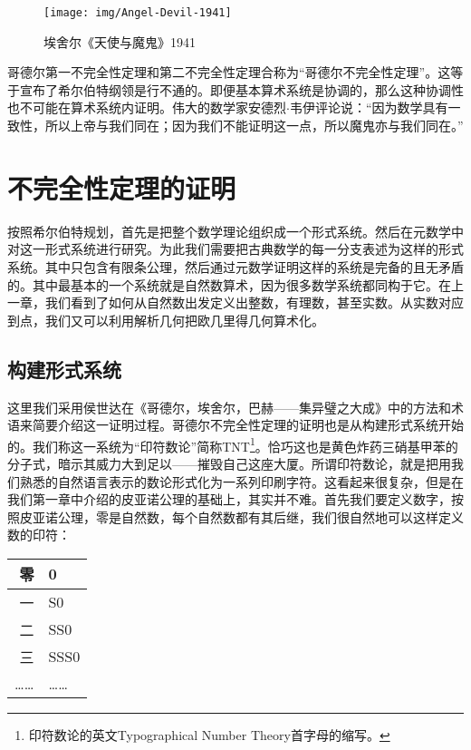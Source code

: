 \documentclass[b5paper]{ctexart}
\begin{document}
\begin{figure}[htbp]
 \centering
 \texttt{[image: img/Angel-Devil-1941]}
 \caption{埃舍尔《天使与魔鬼》1941}
 \label{fig:Angel-Devil-1941}
\end{figure}

哥德尔第一不完全性定理和第二不完全性定理合称为“哥德尔不完全性定理”。这等于宣布了希尔伯特纲领是行不通的。即便基本算术系统是协调的，那么这种协调性也不可能在算术系统内证明。伟大的数学家安德烈$\cdot$韦伊评论说：“因为数学具有一致性，所以上帝与我们同在；因为我们不能证明这一点，所以魔鬼亦与我们同在。”\cite{HanXueTao16}

\section{不完全性定理的证明}

按照希尔伯特规划，首先是把整个数学理论组织成一个形式系统。然后在元数学中对这一形式系统进行研究。为此我们需要把古典数学的每一分支表述为这样的形式系统。其中只包含有限条公理，然后通过元数学证明这样的系统是完备的且无矛盾的。其中最基本的一个系统就是自然数算术，因为很多数学系统都同构于它。在上一章，我们看到了如何从自然数出发定义出整数，有理数，甚至实数。从实数对应到点，我们又可以利用解析几何把欧几里得几何算术化。

\subsection{构建形式系统}
 
这里我们采用侯世达在《哥德尔，埃舍尔，巴赫——集异璧之大成》中的方法和术语来简要介绍这一证明过程。哥德尔不完全性定理的证明也是从构建形式系统开始的。我们称这一系统为“印符数论”简称TNT\footnote{印符数论的英文Typographical Number Theory首字母的缩写。}。恰巧这也是黄色炸药三硝基甲苯的分子式，暗示其威力大到足以——摧毁自己这座大厦。所谓印符数论，就是把用我们熟悉的自然语言表示的数论形式化为一系列印刷字符。这看起来很复杂，但是在我们第一章中介绍的皮亚诺公理的基础上，其实并不难。首先我们要定义数字，按照皮亚诺公理，零是自然数，每个自然数都有其后继，我们很自然地可以这样定义数的印符：

\vspace{5mm}
\begin{tabular}{|r|l|}
零 & 0 \\
\hline
一 & S0 \\
\hline
二 & SS0 \\
\hline
三 & SSS0 \\
\hline
…… & …… \\
\end{tabular}
\vspace{5mm}
\end{document}

